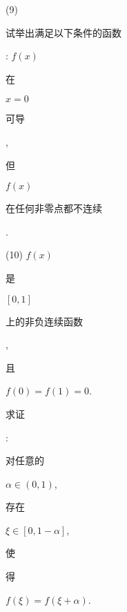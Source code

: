 \documentclass[10pt]{article}
\begin{document}
(9) \begin{CJK}{UTF8}{mj}试举出满足以下条件的函数\end{CJK}: $f(x)$ \begin{CJK}{UTF8}{mj}在\end{CJK} $x=0$ \begin{CJK}{UTF8}{mj}可导\end{CJK}, \begin{CJK}{UTF8}{mj}但\end{CJK} $f(x)$ \begin{CJK}{UTF8}{mj}在任何非零点都不连续\end{CJK}.

(10) $f(x)$ \begin{CJK}{UTF8}{mj}是\end{CJK} $[0,1]$ \begin{CJK}{UTF8}{mj}上的非负连续函数\end{CJK}, \begin{CJK}{UTF8}{mj}且\end{CJK} $f(0)=f(1)=0$. \begin{CJK}{UTF8}{mj}求证\end{CJK}: \begin{CJK}{UTF8}{mj}对任意的\end{CJK} $\alpha \in(0,1)$, \begin{CJK}{UTF8}{mj}存在\end{CJK} $\xi \in[0,1-\alpha]$, \begin{CJK}{UTF8}{mj}使\end{CJK} \begin{CJK}{UTF8}{mj}得\end{CJK} $f(\xi)=f(\xi+\alpha)$.
\end{document}

